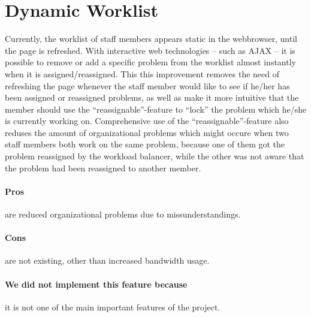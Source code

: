 \section{Dynamic Worklist}
\label{sec:dynamic_worklist}

Currently, the worklist of staff members appears static in the webbrowser, until the page is refreshed. With interactive web technologies -- such as AJAX -- it is possible to remove or add a specific problem from the worklist almost instantly when it is assigned/reassigned.
This this improvement removes the need of refreshing the page whenever the staff member would like to see if he/her has been assigned or reassigned problems, as well as make it more intuitive that the member should use the ``reassignable''-feature to ``lock'' the problem which he/she is currently working on. Comprehensive use of the ``reassignable''-feature also reduses the amount of organizational problems which might occure when two staff members both work on the same problem, because one of them got the problem reassigned by the workload balancer, while the other was not aware that the problem had been reassigned to another member.

\paragraph{Pros} are reduced organizational problems due to missunderstandings. 
\paragraph{Cons} are not existing, other than increased bandwidth usage.
\paragraph{We did not implement this feature because} it is not one of the main important features of the project.
